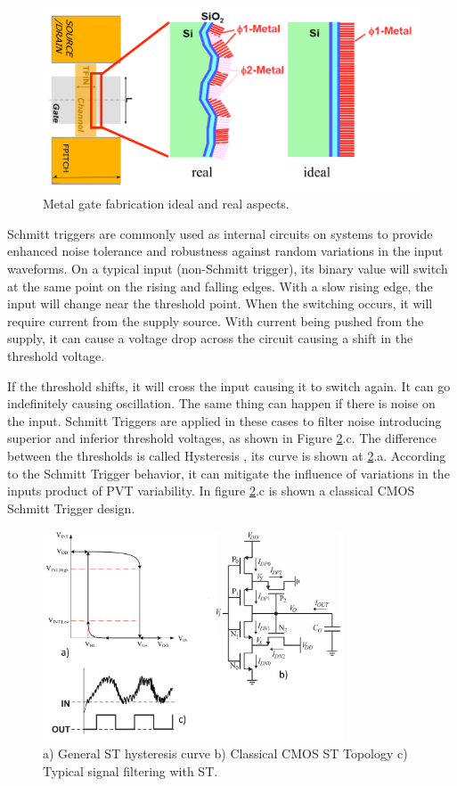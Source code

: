 \documentclass[ecp,tc, english]{iiufrgs}
\begin{document}
\begin{figure}[H]
\centering
\includegraphics[width=\textwidth]{wff.png}
\caption{Metal gate fabrication ideal and real aspects.}
\label{wff}
\end{figure}
  
Schmitt triggers are commonly used as internal circuits on systems to provide enhanced noise tolerance and robustness against random variations in the input waveforms. On a typical input (non-Schmitt trigger), its binary value will switch at the same point on the rising and falling edges. With a slow rising edge, the input will change near the threshold point. When the switching occurs, it will require current from the supply source. With current being pushed from the supply, it can cause a voltage drop across the circuit causing a shift in the threshold voltage. 

If the threshold shifts, it will cross the input causing it to switch again. It can go indefinitely causing oscillation. The same thing can happen if there is noise on the input. Schmitt Triggers are applied in these cases to filter noise introducing superior and inferior threshold voltages, as shown in Figure \ref{fig:Fig3}.c. The difference between the thresholds is called Hysteresis \cite{WinNT}, its curve is shown at \ref{fig:Fig3}.a. According to the Schmitt Trigger behavior, it can mitigate the influence of variations in the inputs product of PVT variability. In figure \ref{fig:Fig3}.c is shown a classical CMOS Schmitt Trigger design. 

\begin{figure}[H]
\centering
\includegraphics[width=0.8\textwidth]{Hysteresis.png}
\caption{a) General ST hysteresis curve b) Classical CMOS ST Topology c) Typical signal filtering with ST.}
\label{fig:Fig3}
\end{figure}
\end{document}

